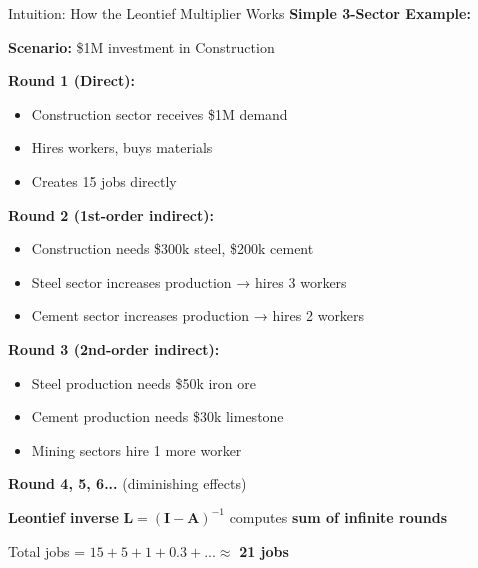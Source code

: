 \documentclass[10pt]{beamer}
\begin{document}
\begin{frame}{Intuition: How the Leontief Multiplier Works}
\textbf{Simple 3-Sector Example:}

\vspace{0.3cm}

\textbf{Scenario:} \$1M investment in Construction

\vspace{0.2cm}

\textbf{Round 1 (Direct):}
\begin{itemize}
    \item Construction sector receives \$1M demand
    \item Hires workers, buys materials
    \item Creates 15 jobs directly
\end{itemize}

\vspace{0.2cm}

\textbf{Round 2 (1st-order indirect):}
\begin{itemize}
    \item Construction needs \$300k steel, \$200k cement
    \item Steel sector increases production → hires 3 workers
    \item Cement sector increases production → hires 2 workers
\end{itemize}

\vspace{0.2cm}

\textbf{Round 3 (2nd-order indirect):}
\begin{itemize}
    \item Steel production needs \$50k iron ore
    \item Cement production needs \$30k limestone
    \item Mining sectors hire 1 more worker
\end{itemize}

\vspace{0.2cm}

\textbf{Round 4, 5, 6...} (diminishing effects)

\vspace{0.3cm}

\textbf{Leontief inverse} $\mathbf{L} = (\mathbf{I} - \mathbf{A})^{-1}$ computes \textbf{sum of infinite rounds}

Total jobs = $15 + 5 + 1 + 0.3 + ... \approx$ \textbf{21 jobs}

\end{frame}
\end{document}
